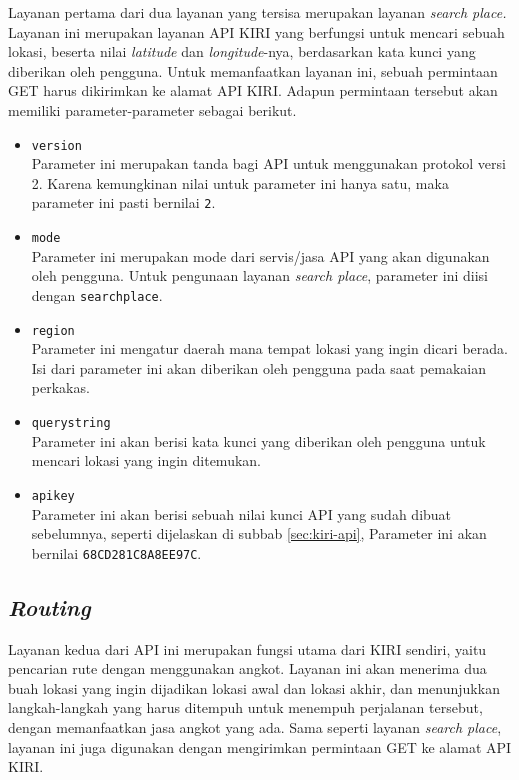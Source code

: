 Layanan pertama dari dua layanan yang tersisa merupakan layanan \textit{search place.} Layanan ini merupakan layanan API KIRI yang berfungsi untuk mencari sebuah lokasi, beserta nilai \textit{latitude} dan \textit{longitude}-nya, berdasarkan kata kunci yang diberikan oleh pengguna. Untuk memanfaatkan layanan ini, sebuah permintaan GET harus dikirimkan ke alamat API KIRI. Adapun permintaan tersebut akan memiliki parameter-parameter sebagai berikut.

\begin{itemize}
	\item \verb|version|\\
	Parameter ini merupakan tanda bagi API untuk menggunakan protokol versi 2. Karena kemungkinan nilai untuk parameter ini hanya satu, maka parameter ini pasti bernilai \verb|2|.
	\item \verb|mode|\\
	Parameter ini merupakan mode dari servis/jasa API yang akan digunakan oleh pengguna. Untuk pengunaan layanan \textit{search place}, parameter ini diisi dengan \verb|searchplace|.
	\item \verb|region|\\
	Parameter ini mengatur daerah mana tempat lokasi yang ingin dicari berada. Isi dari parameter ini akan diberikan oleh pengguna pada saat pemakaian perkakas.
	\item \verb|querystring|\\
	Parameter ini akan berisi kata kunci yang diberikan oleh pengguna untuk mencari lokasi yang ingin ditemukan.
	\item \verb|apikey|\\
	Parameter ini akan berisi sebuah nilai kunci API yang sudah dibuat sebelumnya, seperti dijelaskan di subbab \ref{sec:kiri-api}, Parameter ini akan bernilai \verb|68CD281C8A8EE97C|.
\end{itemize}

\subsection{\textit{Routing}}
\label{sec:analysis-kiri-findroute}

Layanan kedua dari API ini merupakan fungsi utama dari KIRI sendiri, yaitu pencarian rute dengan menggunakan angkot. Layanan ini akan menerima dua buah lokasi yang ingin dijadikan lokasi awal dan lokasi akhir, dan menunjukkan langkah-langkah yang harus ditempuh untuk menempuh perjalanan tersebut, dengan memanfaatkan jasa angkot yang ada. Sama seperti layanan \textit{search place}, layanan ini juga digunakan dengan mengirimkan permintaan GET ke alamat API KIRI.

